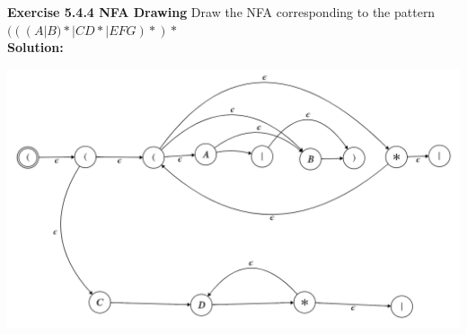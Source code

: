 \documentclass[11pt,fleqn]{article}
\begin{document}
\textbf{Exercise 5.4.4 NFA Drawing} Draw the NFA corresponding to the pattern $(((A|B)*|CD*|EFG)*)*$\\

\textbf{Solution:}

\begin{center}
\includegraphics[scale=.7]{5.4.4.png}
\end{center}
\end{document}
